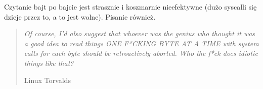Czytanie bajt po bajcie jest strasznie i koszmarnie nieefektywne (dużo syscalli się dzieje przez to, a to jest wolne). Pisanie również.

\begin{quote}
\textit{
    Of course, I'd also suggest that whoever was the genius who thought it
was a good idea to read things ONE F*CKING BYTE AT A TIME with system
calls for each byte should be retroactively aborted. Who the f*ck does
idiotic things like that?}

Linux Torvalds
\end{quote}